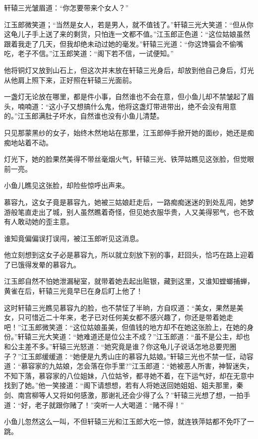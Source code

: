 \documentclass[12pt,oneside]{book}
\begin{document}
轩辕三光皱眉道：``你怎要带来个女人？''

江玉郎微笑道；``当然是女人，若是男人，就不值钱了。''轩辕三光大笑道：``但从你这龟儿子手上送了来的剩货，只怕连一文都不值。''江玉郎正色道：``这位姑娘虽然跟着我走了几天，但我却绝未动过她的毫发。''轩辕三光道：``你这馋猫会不偷嘴吃，老子不信。''江玉郎笑道：``阁下若不信，一试便知。''

他将铜灯又放到山石上，但这次并末放在轩辕三光身后，却放到他自己身后，灯光从他肩上照下来，正好照在轩辕三光面前。

一盏灯无论放在哪里，都是件小事，自然谁也不会在意，但小鱼儿却不禁皱起了眉头，喃喃道：``这小子又想搞什么鬼，他将这盏灯带进带出，绝不会没有用意的。''江玉郎满肚子坏水，自然谁也没有小鱼儿清楚。

只见那蒙黑纱的女子，始终木然地站在那里，江玉郎伸手掀开她的面纱，她还是痴痴地站着不动。

灯光下，她的脸果然美得不带丝毫烟火气，轩辕三光、铁萍姑瞧见这张脸，但觉眼前一亮。

小鱼儿瞧见这张脸，却险些惊呼出声来。

慕容九，这女子竟是慕容九，她被三姑娘赶走后，一路痴痴迷迷的到处乱闯，她梦游般笔直走出了城，别人虽然瞧着奇怪，但见她衣服华贵，人又美得邪气，也不致有人敢动她的歪主意。

谁知竟偏偏误打误闯，被江玉郎听见这消息。

他立刻想到这女子必是慕容九，所以就立刻放下别的事，赶回头，恰巧在路上迎着了已饿得发晕的慕容九。

江玉郎自然不怕她泄漏秘室，就带着她去起出赃银，藏到这里，又谁知螳螂捕蝉，黄雀在后，轩辕三光竟早巳在身后盯上他了！

这时轩辕三光瞧见慕容九的脸，也不禁怔了半晌，方自叹道：``美女，果然是美女，只可惜近二十年来，老子已对任何美女都不感兴趣了，你还是带着她走吧！''江玉郎微笑道：``这位姑娘虽美，但值钱的地方却不在她这张脸上，在她的身份。''轩辕三光大笑道：``她难道还是位公主不成？''江玉郎道：``虽不是公主，却也和公主差不多。''轩辕三光怒道：``她究竟是谁？你这龟儿子说话怎地总要兜圈子？''江玉郎缓缓道：``她便是九秀山庄的慕容九姑娘。''轩辕三光也不禁一怔，动容道：``慕容家的九姑娘，怎会落在你手里?''江玉郎道：``她被恶人所害，神智迷失，不知下落，慕容家的八位姐妹，八位姑爷，都寻她不着，在下运气好，却在无意中找到了她。''他一笑接道：``阁下请想想，若有人将她送回她姐姐、姐夫那里，秦剑、南宫柳等人又将如何感激，那谢礼还会少得了么？''轩辕三光想了想，一拍手道：``好，老子就跟你赌了！''突听一人大喝道：``赌不得！''

小鱼儿忽然这么一叫，不但轩辕三光和江玉郎大吃一惊，就连铁萍姑都不免吓了一跳。
\end{document}
